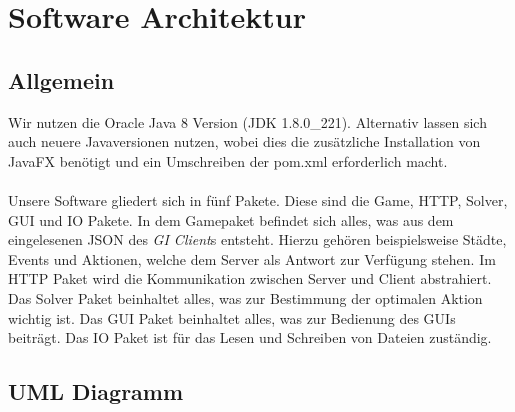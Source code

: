 \documentclass{article}
\newcommand{\displayimage}[1]{\begin{center}\makebox[\textwidth]{\texttt{[image: \#1]}}\end{center}}
\let\oldgls\gls
\renewcommand{\gls}[1]{\emph{\oldgls{#1}}} %
\begin{document}
\section{Software Architektur}
\subsection{Allgemein}
Wir nutzen die Oracle Java 8 Version (JDK 1.8.0\_221). Alternativ lassen sich auch neuere Javaversionen nutzen, wobei dies die zusätzliche Installation von JavaFX benötigt und ein Umschreiben der pom.xml erforderlich macht. \\\\
Unsere Software gliedert sich in fünf Pakete. Diese sind die Game, HTTP, Solver, GUI und IO Pakete. In dem Gamepaket befindet sich alles, was aus dem eingelesenen JSON des \gls{GI Client}s entsteht. Hierzu gehören beispielsweise Städte, Events und Aktionen, welche dem Server als Antwort zur Verfügung stehen. Im HTTP Paket wird die Kommunikation zwischen Server und Client abstrahiert. Das Solver Paket beinhaltet alles, was zur Bestimmung der optimalen Aktion wichtig ist. Das GUI Paket beinhaltet alles, was zur Bedienung des GUIs beiträgt. Das IO Paket ist für das Lesen und Schreiben von Dateien zuständig.
\subsection{UML Diagramm}
\displayimage{resources/UML-model.png} %
\end{document}
